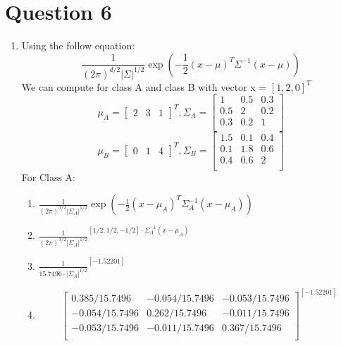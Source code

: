 \documentclass{article}
\begin{document}
\section*{Question 6}
\begin{enumerate}[label=\alph*)]
    \item Using the follow equation:
    \[
        \frac{1}{(2 \pi)^{d/2} |\Sigma|^{1/2}} \exp \left( -\frac{1}{2} (x-\mu)^T \Sigma^{-1} (x-\mu) \right)
    \]
    We can compute for class A and class B with vector x = $[1,2,0]^T$
    \[
        \mu_A = 
        \begin{bmatrix}
            2 & 3 & 1
        \end{bmatrix}^T,
        \Sigma_A = 
        \begin{bmatrix}
            1 & 0.5 & 0.3 \\
            0.5 & 2 & 0.2 \\
            0.3 & 0.2 & 1 \\
        \end{bmatrix}
    \]
    \[
        \mu_B = 
        \begin{bmatrix}
            0 & 1 & 4
        \end{bmatrix}^T,
        \Sigma_B = 
        \begin{bmatrix}
            1.5 & 0.1 & 0.4 \\
            0.1 & 1.8 & 0.6 \\
            0.4 & 0.6 & 2 \\
        \end{bmatrix}
    \]
For Class A:
\begin{enumerate}[label=\Roman*)]
    \item $\frac{1}{(2 \pi)^{3/2} |\Sigma_A|^{1/2}} \exp \left( -\frac{1}{2} (x-\mu_A)^T \Sigma_A^{-1} (x-\mu_A) \right)$
    \item $\frac{1}{(2 \pi)^{3/2} |\Sigma_A|^{1/2}}^{[1/2, 1/2, -1/2] \cdot \Sigma_A^{-1} (x-\mu_A)}$
    \item $\frac{1}{15.7496 \cdot |\Sigma_A|^{1/2}}^{[-1.52201]}$
    \item \[
        \begin{bmatrix}
            0.385/15.7496 & -0.054/15.7496 & -0.053/15.7496 \\
            -0.054/15.7496 & 0.262/15.7496 & -0.011/15.7496 \\
            -0.053/15.7496 & -0.011/15.7496 & 0.367/15.7496 \\
        \end{bmatrix}^{[-1.52201]}
    \]
\end{enumerate}


\end{enumerate}
\end{document}
